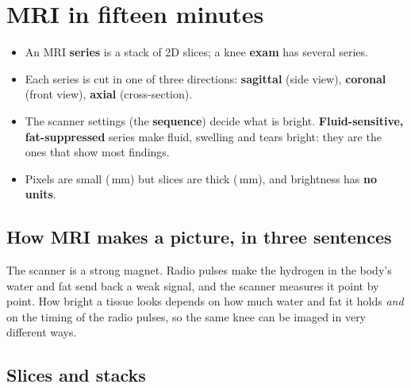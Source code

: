 \chapter{MRI in fifteen minutes}
\label{ch:mri}

\begin{tldr}
\begin{itemize}
\item An MRI \textbf{series} is a stack of 2D slices; a knee \textbf{exam} has several series.
\item Each series is cut in one of three directions: \textbf{sagittal} (side view), \textbf{coronal} (front view),
      \textbf{axial} (cross-section).
\item The scanner settings (the \textbf{sequence}) decide what is bright. \textbf{Fluid-sensitive, fat-suppressed}
      series make fluid, swelling and tears bright: they are the ones that show most findings.
\item Pixels are small (\,mm) but slices are thick (\,mm), and brightness has \textbf{no units}.
\end{itemize}
\end{tldr}

\section{How MRI makes a picture, in three sentences}

The scanner is a strong magnet. Radio pulses make the hydrogen in the body's water and fat send back a weak
signal, and the scanner measures it point by point. How bright a tissue looks depends on how much water and fat
it holds \emph{and} on the timing of the radio pulses, so the same knee can be imaged in very different ways.

\section{Slices and stacks}

